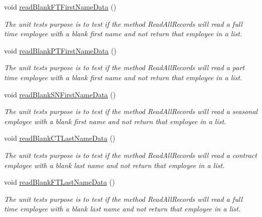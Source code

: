 \begin{DoxyCompactItemize}
void \hyperlink{class_file_i_o_tests_1_1_file_i_o_tests_a58310a35716d42d44af98881596d5fc7}{read\+Blank\+F\+T\+First\+Name\+Data} ()
\begin{DoxyCompactList}\small\item\em The unit test\textquotesingle{}s purpose is to test if the method Read\+All\+Records will read a full time employee with a blank first name and not return that employee in a list. \end{DoxyCompactList}\item 
void \hyperlink{class_file_i_o_tests_1_1_file_i_o_tests_a81583e556d22a53af94598f798550c06}{read\+Blank\+P\+T\+First\+Name\+Data} ()
\begin{DoxyCompactList}\small\item\em The unit test\textquotesingle{}s purpose is to test if the method Read\+All\+Records will read a part time employee with a blank first name and not return that employee in a list. \end{DoxyCompactList}\item 
void \hyperlink{class_file_i_o_tests_1_1_file_i_o_tests_ab5c4962dd7d6076fbb38d4642cee3dd2}{read\+Blank\+S\+N\+First\+Name\+Data} ()
\begin{DoxyCompactList}\small\item\em The unit test\textquotesingle{}s purpose is to test if the method Read\+All\+Records will read a seasonal employee with a blank first name and not return that employee in a list. \end{DoxyCompactList}\item 
void \hyperlink{class_file_i_o_tests_1_1_file_i_o_tests_aa1b1249b1659362a53ae771948797f61}{read\+Blank\+C\+T\+Last\+Name\+Data} ()
\begin{DoxyCompactList}\small\item\em The unit test\textquotesingle{}s purpose is to test if the method Read\+All\+Records will read a contract employee with a blank last name and not return that employee in a list. \end{DoxyCompactList}\item 
void \hyperlink{class_file_i_o_tests_1_1_file_i_o_tests_a63bac6e2d509044cfcbb504cf630910c}{read\+Blank\+F\+T\+Last\+Name\+Data} ()
\begin{DoxyCompactList}\small\item\em The unit test\textquotesingle{}s purpose is to test if the method Read\+All\+Records will read a full time employee with a blank last name and not return that employee in a list. \end{DoxyCompactList}\item 

\end{DoxyCompactItemize}
